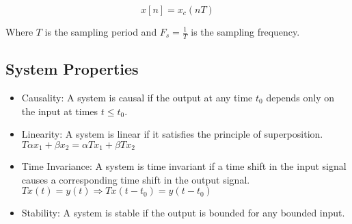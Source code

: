 \documentclass[letterpaper]{article}
\newcommand{\divline}{\noindent\makebox[\linewidth]{\rule{\textwidth}{0.4pt}}}
\begin{document}
\begin{multicols}{2}
        \[x[n] = x_c(nT)\]

        Where $T$ is the sampling period and $F_s = \frac{1}{T}$ is the sampling frequency.

        \subsection{System Properties}

        \begin{itemize}
            \item Causality: A system is causal if the output at any time $t_0$ depends only on the input at times $t \leq t_0$.
            \item Linearity: A system is linear if it satisfies the principle of superposition. $T{\alpha x_1 + \beta x_2} = \alpha T{x_1} + \beta T{x_2}$
            \item Time Invariance: A system is time invariant if a time shift in the input signal causes a corresponding time shift in the output signal. $T{x(t)} = y(t) \Rightarrow T{x(t-t_0)} = y(t-t_0)$
            \item Stability: A system is stable if the output is bounded for any bounded input.
        \end{itemize}
    \end{multicols}

    \divline
\end{document}
